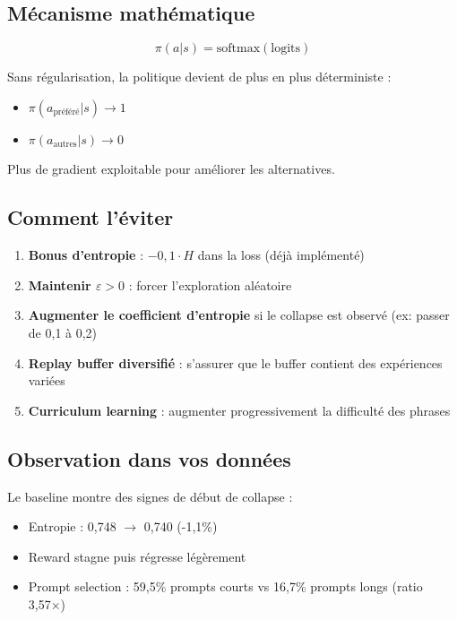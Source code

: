 \documentclass[11pt,a4paper]{article}
\begin{document}
\subsection{Mécanisme mathématique}

\begin{equation}
\pi(a|s) = \text{softmax}(\text{logits})
\end{equation}

Sans régularisation, la politique devient de plus en plus déterministe :
\begin{itemize}
    \item $\pi(a_{\text{préféré}}|s) \rightarrow 1$
    \item $\pi(a_{\text{autres}}|s) \rightarrow 0$
\end{itemize}

Plus de gradient exploitable pour améliorer les alternatives.

\subsection{Comment l'éviter}

\begin{enumerate}
    \item \textbf{Bonus d'entropie} : $-0{,}1 \cdot H$ dans la loss (déjà implémenté)
    \item \textbf{Maintenir $\varepsilon > 0$} : forcer l'exploration aléatoire
    \item \textbf{Augmenter le coefficient d'entropie} si le collapse est observé (ex: passer de 0{,}1 à 0{,}2)
    \item \textbf{Replay buffer diversifié} : s'assurer que le buffer contient des expériences variées
    \item \textbf{Curriculum learning} : augmenter progressivement la difficulté des phrases
\end{enumerate}

\subsection{Observation dans vos données}

Le baseline montre des signes de début de collapse :
\begin{itemize}
    \item Entropie : 0{,}748 $\rightarrow$ 0{,}740 (-1{,}1\%)
    \item Reward stagne puis régresse légèrement
    \item Prompt selection : 59{,}5\% prompts courts vs 16{,}7\% prompts longs (ratio 3{,}57×)
\end{itemize}
\end{document}
